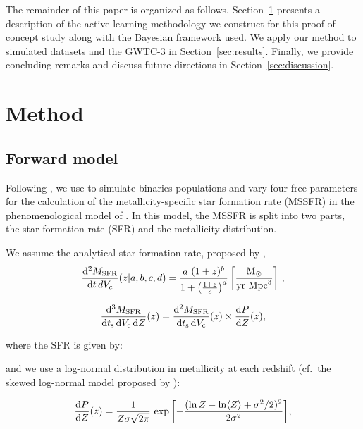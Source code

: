 \documentclass[twocolumn]{aastex631}
\begin{document}
The remainder of this paper is organized as follows. 
Section~\ref{sec:methods} presents a description of the active learning methodology we construct for this proof-of-concept study along with the Bayesian framework used. 
We apply our method to simulated datasets and the GWTC-3 in Section~\ref{sec:results}. Finally, we provide concluding remarks and discuss future directions in Section~\ref{sec:discussion}.


\section{Method}\label{sec:methods}


\subsection{Forward model}\label{sec:method_parameters}
Following \citet{Riley:2023:ApJ}, we use \COMPAS to simulate binaries populations and vary four free parameters for the calculation of the metallicity-specific star formation rate (MSSFR) in the phenomenological model of \citet{Neijssel_2019}. 
In this model, the MSSFR is split into two parts, the star formation rate (SFR) and the metallicity distribution.


We assume the analytical star formation rate, proposed by \citet{Madau_2014}, 
\begin{equation}
  \frac{\diff^2 M_{\rm SFR}}{\diff t\,dV_c}(z | a,b,c,d) =
  \frac{a\ (1 + z)^b}{1 + \big(\frac{1 + z}{c}\big)^d}\,\bigg[ \frac{\mathrm{M}_\odot}{\mathrm{yr}\ \mathrm{Mpc}^{3}}\bigg]
  \ ,
\end{equation}


\begin{equation}
  \frac{\diff^3 \MSFR}{\diff \ts \diff \Vc \diff Z}(z) =
  \frac{\diff^2 \MSFR}{\diff \ts \diff \Vc }(z)
  \times
  \frac{\diff P }{\diff Z}(z),
\end{equation}

\noindent
where the SFR is given by:



\bigskip\noindent
and we use a log-normal distribution in metallicity at each redshift (cf.~the skewed log-normal model proposed by \citet{vanSon_2022}):

\begin{equation}
  \frac{\diff P }{\diff Z}(z) =
  \frac{1}{Z\sigma\sqrt{2\pi}}\, \exp\bigg[{-\frac{(\ln Z-\ln \langle Z \rangle +\sigma^2/2)^2}{2\sigma^2}}\bigg],
\end{equation}
\end{document}
